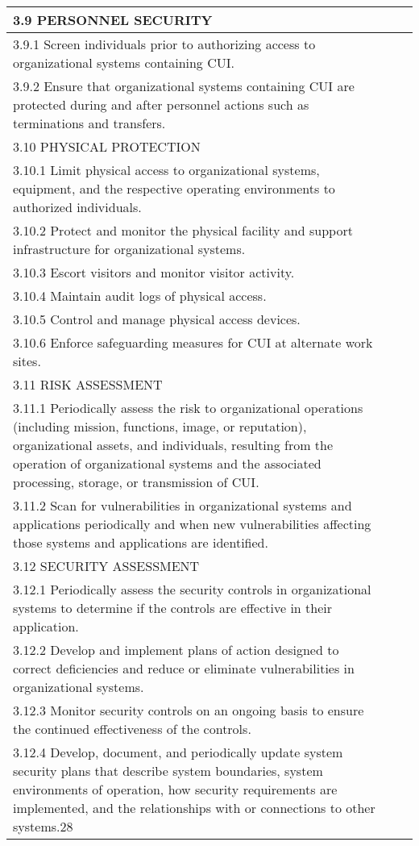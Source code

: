 \begin{longtable} {|p{}|p{}|p{} |}
{3.9 PERSONNEL SECURITY}&& \\ \hline
{3.9.1 Screen individuals prior to authorizing access to organizational systems containing CUI.}&& \\ \hline
{3.9.2 Ensure that organizational systems containing CUI are protected during and after personnel actions such as terminations and transfers.}&& \\ \hline
{3.10 PHYSICAL PROTECTION}&& \\ \hline
{3.10.1 Limit physical access to organizational systems, equipment, and the respective operating environments to authorized individuals.}&& \\ \hline
{3.10.2 Protect and monitor the physical facility and support infrastructure for organizational systems.}&& \\ \hline
{3.10.3 Escort visitors and monitor visitor activity.}&& \\ \hline
{3.10.4 Maintain audit logs of physical access.}&& \\ \hline
{3.10.5 Control and manage physical access devices.}&& \\ \hline
{3.10.6 Enforce safeguarding measures for CUI at alternate work sites.}&& \\ \hline
{3.11 RISK ASSESSMENT}&& \\ \hline
{3.11.1 Periodically assess the risk to organizational operations (including mission, functions, image, or reputation), organizational assets, and individuals, resulting from the operation of organizational systems and the associated processing, storage, or transmission of CUI.}&& \\ \hline
{3.11.2 Scan for vulnerabilities in organizational systems and applications periodically and when new vulnerabilities affecting those systems and applications are identified.}&& \\ \hline
{3.12 SECURITY ASSESSMENT}&& \\ \hline
{3.12.1 Periodically assess the security controls in organizational systems to determine if the controls are effective in their application.}&& \\ \hline
{3.12.2 Develop and implement plans of action designed to correct deficiencies and reduce or eliminate vulnerabilities in organizational systems.}&& \\ \hline
{3.12.3 Monitor security controls on an ongoing basis to ensure the continued effectiveness of the controls.}&& \\ \hline
{3.12.4 Develop, document, and periodically update system security plans that describe system boundaries, system environments of operation, how security requirements are implemented, and the relationships with or connections to other systems.28}&& \\ \hline

\end{longtable}
